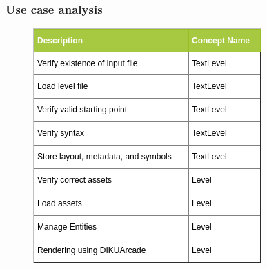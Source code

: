 \begin{frame}
    \frametitle{Use case analysis}
    \begin{figure}
      \begin{center}
        \includegraphics[height=0.7\textheight]{UseCase.png}
      \end{center}
    \end{figure}
\end{frame}
